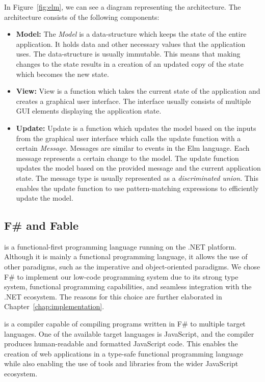 In Figure~\ref{fig:elm}, we can see a diagram representing the architecture.
The architecture consists of the following components:
\begin{itemize}
	\item \textbf{Model:} The \emph{Model} is a data-structure which keeps the state of the entire application. It
	      holds data and other necessary values that the application uses.
	      The data-structure is usually immutable.
	      This means that making changes to the state results in a creation
	      of an updated copy of the state which becomes the new state.

	\item \textbf{View:} View is a function which takes the current state of the application and creates a
	      graphical user interface. The interface usually consists of multiple GUI elements displaying the application state.

	\item \textbf{Update:} Update is a function which updates the model based on the inputs from the graphical user interface which calls the update function with a certain \emph{Message}.
	      Messages are similar to events in the Elm language. Each message represents a certain change to the model.
	      The update function updates the model based on the provided message and the current application state.
	      The message type is usually represented as a \emph{discriminated union}.
	      This enables the update function to use pattern-matching expressions to efficiently update the model.
\end{itemize}

\subsection{F\# and Fable}
\label{sub:Fable}

\citet{fsharp} is a functional-first programming language running on the .NET platform.
Although it is mainly a functional programming language, it allows the use of other paradigms, such as the imperative and object-oriented paradigms.
We chose F\# to implement our low-code programming system due to its strong type system, functional programming capabilities, and seamless integration with the .NET ecosystem.
The reasons for this choice are further elaborated in Chapter~\ref{chap:implementation}.

\citet{fable} is a compiler capable of compiling programs written in F\# to multiple target languages.
One of the available target languages is JavaScript, and the compiler produces human-readable and formatted JavaScript code.
This enables the creation of web applications in a type-safe functional programming language while also enabling the use of tools and libraries from the wider JavaScript ecosystem.

